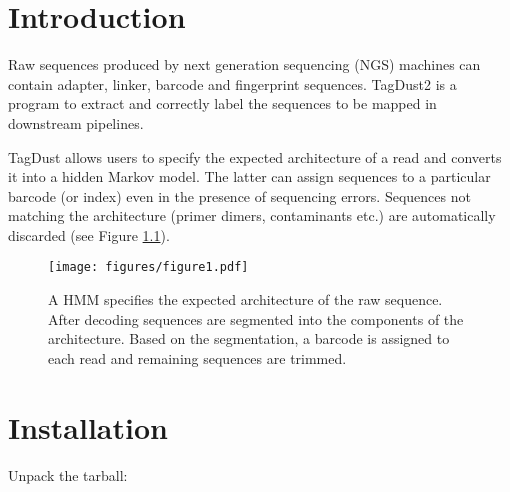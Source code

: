 \documentclass[11pt,a4paper,oneside]{book}
\begin{document}
\tableofcontents
\mainmatter

\chapter{Introduction}


Raw sequences produced by next generation sequencing (NGS) machines can contain adapter, linker, barcode and fingerprint sequences. TagDust2 is a program to extract and correctly label the sequences to be mapped in downstream pipelines.

TagDust allows users to specify the expected architecture of a read and converts it into a hidden Markov model. The latter can assign sequences to a particular barcode (or index) even in the presence of sequencing errors. Sequences not matching the architecture (primer dimers, contaminants etc.) are automatically discarded (see Figure \ref{figure1}).



\begin{figure}[h!]

\begin{center}
\texttt{[image: figures/figure1.pdf]}
\end{center}
\caption{A HMM specifies the expected architecture of the raw sequence. After decoding sequences are segmented into the components of the architecture. Based on the segmentation, a barcode is assigned to each read and remaining sequences are trimmed.}
\label{figure1}
\end{figure}



\newpage

\chapter{Installation}


Unpack the tarball:
\end{document}
